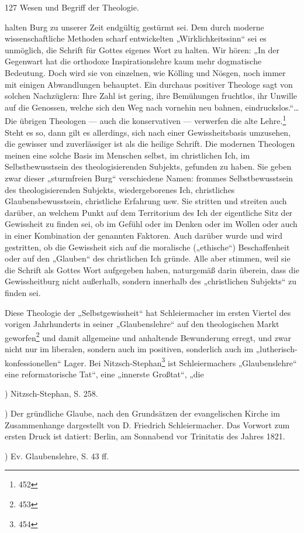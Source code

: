 127
Wesen und Begriff der Theologie.

halten Burg zu unserer Zeit endgültig gestürmt sei. Dem durch moderne wissenschaftliche Methoden scharf entwickelten „Wirklichkeitssinn“ sei es unmöglich, die Schrift für Gottes eigenes Wort zu halten. Wir hören: „In der Gegenwart hat die orthodoxe Inspirationslehre kaum mehr dogmatische Bedeutung. Doch wird sie von einzelnen, wie Kölling und Nösgen, noch immer mit einigen Abwandlungen behauptet. Ein durchaus positiver Theologe sagt von solchen Nachzüglern: Ihre Zahl ist gering, ihre Bemühungen fruchtlos, ihr Unwille auf die Genossen, welche sich den Weg nach vornehin neu bahnen, eindruckslos.“\ldots Die übrigen Theologen --- auch die konservativen --- verwerfen die alte Lehre.\footnote{452} Steht es so, dann gilt es allerdings, sich nach einer Gewissheitsbasis umzusehen, die gewisser und zuverlässiger ist als die heilige Schrift. Die modernen Theologen meinen eine solche Basis im Menschen selbst, im christlichen Ich, im Selbstbewusstsein des theologisierenden Subjekts, gefunden zu haben. Sie geben zwar dieser „sturmfreien Burg“ verschiedene Namen: frommes Selbstbewusstsein des theologisierenden Subjekts, wiedergeborenes Ich, christliches Glaubensbewusstsein, christliche Erfahrung usw. Sie stritten und streiten auch darüber, an welchem Punkt auf dem Territorium des Ich der eigentliche Sitz der Gewissheit zu finden sei, ob im Gefühl oder im Denken oder im Wollen oder auch in einer Kombination der genannten Faktoren. Auch darüber wurde und wird gestritten, ob die Gewissheit sich auf die moralische („ethische“) Beschaffenheit oder auf den „Glauben“ des christlichen Ich gründe. Alle aber stimmen, weil sie die Schrift als Gottes Wort aufgegeben haben, naturgemäß darin überein, dass die Gewissheitburg nicht außerhalb, sondern innerhalb des „christlichen Subjekts“ zu finden sei.\par

Diese Theologie der „Selbstgewissheit“ hat Schleiermacher im ersten Viertel des vorigen Jahrhunderts in seiner „Glaubenslehre“ auf den theologischen Markt geworfen\footnote{453} und damit allgemeine und anhaltende Bewunderung erregt, und zwar nicht nur im liberalen, sondern auch im positiven, sonderlich auch im „lutherisch-konfessionellen“ Lager. Bei Nitzsch-Stephan\footnote{454} ist Schleiermachers „Glaubenslehre“ eine reformatorische Tat“, eine „innerste Großtat“, „die\par

\vspace{\baselineskip}
\begin{footnotesize}
) Nitzsch-Stephan, S. 258.\par
{}) Der gründliche Glaube, nach den Grundsätzen der evangelischen Kirche im Zusammenhange dargestellt von D. Friedrich Schleiermacher. Das Vorwort zum ersten Druck ist datiert: Berlin, am Sonnabend vor Trinitatis des Jahres 1821.\par
{}) Ev. Glaubenslehre, S. 43 ff.\par
\end{footnotesize}